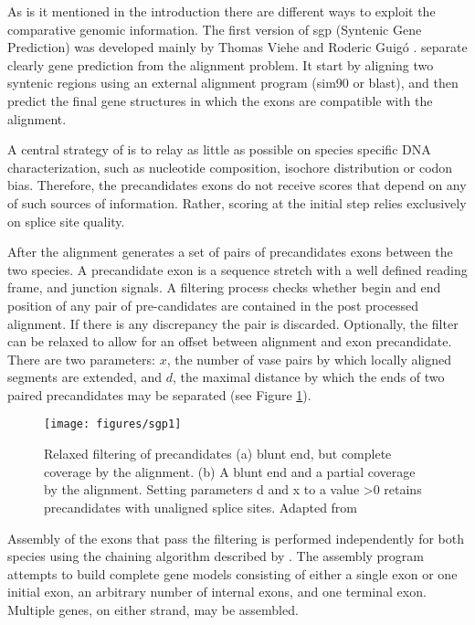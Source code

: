 As is it mentioned in the introduction there are different ways to
exploit the comparative genomic information. The first version of sgp
(Syntenic Gene Prediction) was developed mainly by Thomas Viehe and
Roderic Guig\'o \citep{wiehe:2001a}. \sgpo separate clearly gene
prediction from the alignment problem. It start by aligning two
syntenic regions using an external alignment program (sim90 or
blast), and then predict the final gene structures in which the exons
are compatible with the alignment.

A central strategy of \sgpo is to relay as little as possible on species
specific DNA characterization, such as nucleotide composition,
isochore distribution or codon bias. Therefore, the precandidates exons
do not receive scores that depend on any of such sources of
information. Rather, scoring at the initial step relies exclusively on
splice site quality.

After the alignment \sgpo generates a set of pairs of precandidates
exons between the two species. A precandidate exon is a sequence
stretch with a well defined reading frame, and junction signals. A
filtering process checks whether begin and end position of any pair of
pre-candidates are contained in the post processed alignment. If there
is any discrepancy the pair is discarded. Optionally, the filter can
be relaxed to allow for an offset between alignment and exon
precandidate. There are two parameters: $x$, the number of vase pairs
by which locally aligned segments are extended, and $d$, the maximal
distance by which the ends of two paired precandidates may be separated
(see Figure \ref{sgp1}).

\begin{figure}[h!]
\begin{center}
\texttt{[image: figures/sgp1]}
\caption{Relaxed filtering of precandidates (a) blunt end, but complete
coverage by the alignment. (b) A blunt end and a partial coverage by
the alignment. Setting parameters d and x to a value >0 retains
precandidates with unaligned splice sites. Adapted from
\cite{wiehe:2001a}}
\end{center}

\label{sgp1}

\end{figure}


Assembly of the exons that pass the filtering is performed
independently for both species using the chaining algorithm described
by \cite{guigo:1998a}. The assembly program attempts to build complete
gene models consisting of either a single exon or one initial exon,
an arbitrary number of internal exons, and one terminal exon. Multiple
genes, on either strand, may be assembled.

